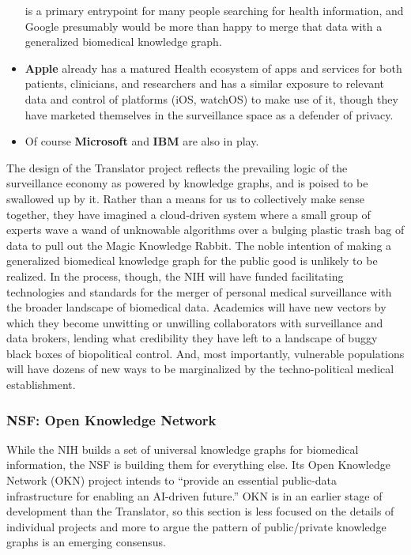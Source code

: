 \begin{itemize}
  is a primary entrypoint for many people searching for health
  information, and Google presumably would be more than happy to merge
  that data with a generalized biomedical knowledge graph.
\item
  \textbf{Apple} already has a matured Health ecosystem of apps and
  services for both patients, clinicians, and researchers \cite{appleEmpoweringPeopleLive2022, appleHealthcare}  and has a similar
  exposure to relevant data and control of platforms (iOS, watchOS) to
  make use of it, though they have marketed themselves in the
  surveillance space as a defender of privacy.
\item
  Of course \textbf{Microsoft} \cite{sinhaOverviewMicrosoftAcademic2015}  and \textbf{IBM} \cite{chenIBMWatsonHow2016}  are also in play.
\end{itemize}

The design of the Translator project reflects the prevailing logic of
the surveillance economy as powered by knowledge graphs, and is poised
to be swallowed up by it. Rather than a means for us to collectively
make sense together, they have imagined a cloud-driven system where a
small group of experts wave a wand of unknowable algorithms over a
bulging plastic trash bag of data to pull out the Magic Knowledge
Rabbit. The noble intention of making a generalized biomedical knowledge
graph for the public good is unlikely to be realized. In the process,
though, the NIH will have funded facilitating technologies and standards
for the merger of personal medical surveillance with the broader
landscape of biomedical data. Academics will have new vectors by which
they become unwitting or unwilling collaborators with surveillance and
data brokers, lending what credibility they have left to a landscape of
buggy black boxes of biopolitical control. And, most importantly,
vulnerable populations will have dozens of new ways to be marginalized
by the techno-political medical establishment.

\hypertarget{nsf-open-knowledge-network}{%
\subsubsection{NSF: Open Knowledge
Network}\label{nsf-open-knowledge-network}}

While the NIH builds a set of universal knowledge graphs for biomedical
information, the NSF is building them for everything else. Its Open
Knowledge Network (OKN) project intends to ``provide an essential
public-data infrastructure for enabling an AI-driven future.'' \cite{baruOpenKnowledgeNetwork2022}  OKN is in an earlier stage of
development than the Translator, so this section is less focused on the
details of individual projects and more to argue the pattern of
public/private knowledge graphs is an emerging consensus.

